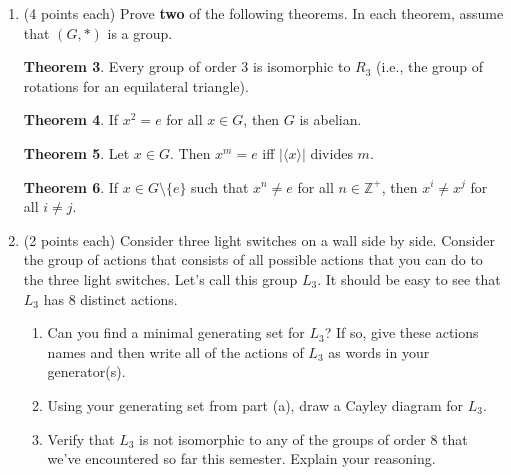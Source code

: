 \documentclass[11pt]{article}
\theoremstyle{definition}
\newtheorem{theorem}{Theorem}
\begin{document}
\begin{enumerate}
\begin{theorem}
Suppose $(G,*)$ is a group.  If there exists $x\in G$ such that $\langle x\rangle =G$, then $G$ is abelian.
\end{theorem}

\begin{theorem}
Assume $(G,\star)$ is a group and let $H$ be a nonempty subset of $G$ that is (i) closed under $\star$ and (ii) closed under inverses (i.e., for all $h,k\in H$, (i) $hk\in H$ and (ii) $h^{-1}\in H$).  Then $H\leq G$.
\end{theorem}

\item (4 points each) Prove \textbf{two} of the following theorems. In each theorem, assume that $(G,*)$ is a group.

\begin{theorem}
Every group of order 3 is isomorphic to $R_3$ (i.e., the group of rotations for an equilateral triangle).
\end{theorem}

\begin{theorem}
If $x^2=e$ for all $x\in G$, then $G$ is abelian.
\end{theorem}

\begin{theorem}
Let $x\in G$. Then $x^m=e$ iff $|\langle x\rangle|$ divides $m$.
\end{theorem}

\begin{theorem}
If $x\in G\setminus\{e\}$ such that $x^n\neq e$ for all $n\in \mathbb{Z}^+$, then $x^i\neq x^j$ for all $i\neq j$.
\end{theorem}

\item (2 points each) Consider three light switches on a wall side by side.  Consider the group of actions that consists of all possible actions that you can do to the three light switches.  Let's call this group $L_3$. It should be easy to see that $L_3$ has 8 distinct actions.
\begin{enumerate}[label=\rm{(\alph*)}]
\item Can you find a minimal generating set for $L_3$?  If so, give these actions names and then write all of the actions of $L_3$ as words in your generator(s).
\item Using your generating set from part (a), draw a Cayley diagram for $L_3$.
\item Verify that $L_3$ is not isomorphic to any of the groups of order 8 that we've encountered so far this semester.  Explain your reasoning.
\end{enumerate}


\end{enumerate}
\end{document}
